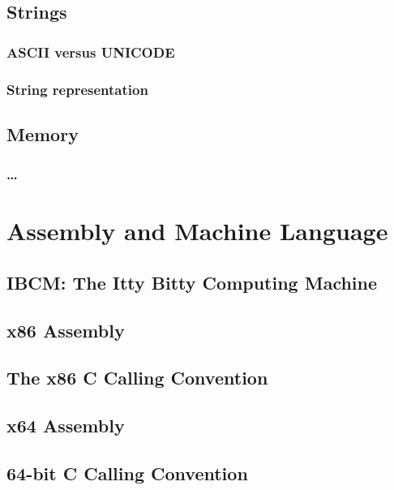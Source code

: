 \documentclass[11pt,twoside]{book}
\begin{document}
\chapter{Strings}

\section{ASCII versus UNICODE}

\section{String representation}


\chapter{Memory}

\section{\ldots}

\part{Assembly and Machine Language}

\chapter{IBCM: The Itty Bitty Computing Machine}



\chapter{x86 Assembly}



\chapter{The x86 C Calling Convention}




\chapter{x64 Assembly}

\chapter{64-bit C Calling Convention}
\end{document}
